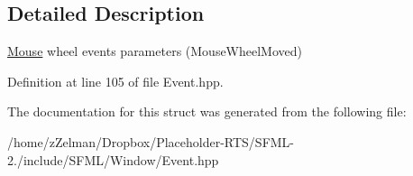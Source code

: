 \subsection{Detailed Description}
\hyperlink{classsf_1_1Mouse}{Mouse} wheel events parameters (Mouse\-Wheel\-Moved) 

Definition at line 105 of file Event.\-hpp.



The documentation for this struct was generated from the following file\-:\begin{DoxyCompactItemize}
\item 
/home/z\-Zelman/\-Dropbox/\-Placeholder-\/\-R\-T\-S/\-S\-F\-M\-L-\/2./include/\-S\-F\-M\-L/\-Window/Event.\-hpp\end{DoxyCompactItemize}
